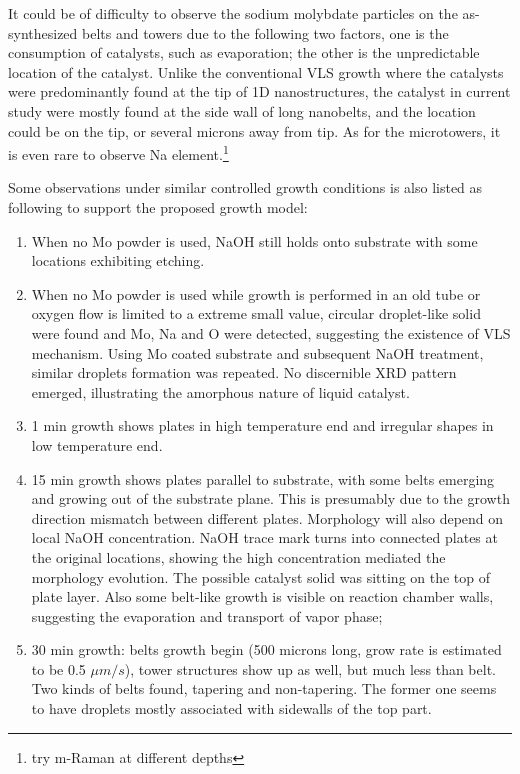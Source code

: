 It could be of difficulty to observe the sodium molybdate particles on the as-synthesized belts and towers due to the following two factors, one is the consumption of catalysts, such as evaporation; the other is the unpredictable location of the catalyst. Unlike the conventional VLS growth where the catalysts were predominantly found at the tip of 1D nanostructures, the catalyst in current study were mostly found at the side wall of long nanobelts, and the location could be on the tip, or several microns away from tip. As for the microtowers, it is even rare to observe Na element.\footnote{try m-Raman at different depths} 

Some observations under similar controlled growth conditions is also listed as following to support the proposed growth model: 

\begin{enumerate}
\item When no Mo powder is used, NaOH still holds onto substrate with some locations exhibiting etching.
\item When no Mo powder is used while growth is performed in an old tube or oxygen flow is limited to a extreme small value, circular droplet-like solid were found and Mo, Na and O were detected, suggesting the existence of VLS mechanism. Using Mo coated substrate and subsequent NaOH treatment, similar droplets formation was repeated. No discernible XRD pattern emerged, illustrating the amorphous nature of liquid catalyst.
\item 1 min growth shows plates in high temperature end and irregular shapes in low temperature end.
\item 15 min growth shows  plates parallel to substrate, with some belts emerging and growing out of the substrate plane. This is presumably due to the growth direction mismatch between different plates. Morphology will also depend on local NaOH concentration. NaOH trace mark turns into connected plates at the original locations, showing the high concentration mediated the morphology evolution. The possible catalyst solid was sitting on the top of plate layer. Also some belt-like growth is visible on reaction chamber walls, suggesting the evaporation and transport of  vapor phase;
\item 30 min growth: belts growth begin (500 microns long, grow rate is estimated to be 0.5 $\mu m/s$), tower structures show up as well, but much less than belt. Two kinds of belts found, tapering and non-tapering. The former one seems to have droplets mostly associated with sidewalls of the top part.

\end{enumerate}
